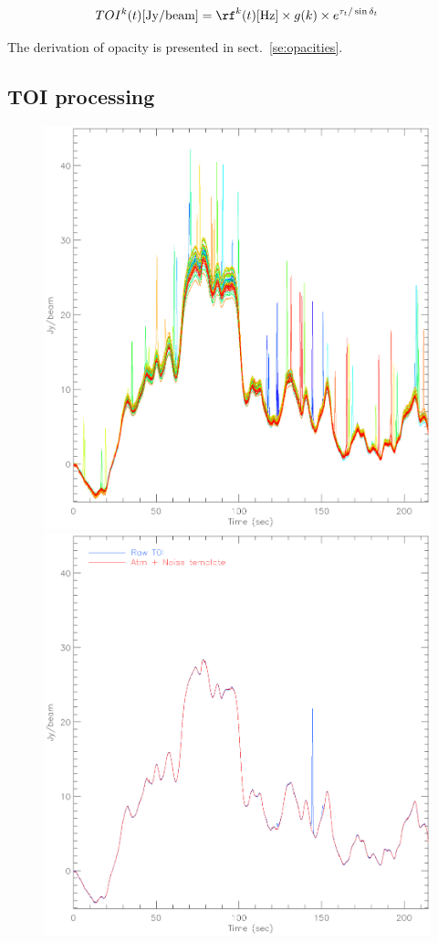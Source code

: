 \begin{equation}
TOI^k(t) [{\rm Jy/beam}] = \rf^k(t)[{\rm Hz}] \times g(k) \times e^{\tau_t/\sin\delta_t}
\end{equation}

The derivation of opacity is presented in sect.~\ref{se:opacities}.

\subsection{TOI processing}
\label{se:toi_proc}

\begin{figure}[hhh]
\begin{center}
\includegraphics[clip, angle=0, scale=0.4]{Figures/toi_plot.eps}
\includegraphics[clip, angle=0, scale=0.4]{Figures/toi_plot_decorr.eps}

\end{center}
\end{figure}
